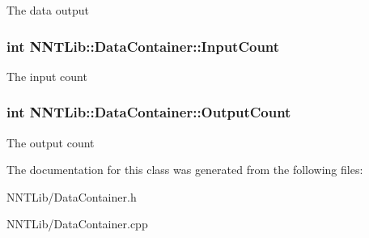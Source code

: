 The data output 

\hypertarget{class_n_n_t_lib_1_1_data_container_a4929c69fbf3ac00f7bbd277414aac54e}{}
\subsubsection[{Input\+Count}]{\setlength{\rightskip}{0pt plus 5cm}int N\+N\+T\+Lib\+::\+Data\+Container\+::\+Input\+Count}\label{class_n_n_t_lib_1_1_data_container_a4929c69fbf3ac00f7bbd277414aac54e}


The input count 

\hypertarget{class_n_n_t_lib_1_1_data_container_a821ff2aaddaf2bd392f0741b5f33799c}{}
\subsubsection[{Output\+Count}]{\setlength{\rightskip}{0pt plus 5cm}int N\+N\+T\+Lib\+::\+Data\+Container\+::\+Output\+Count}\label{class_n_n_t_lib_1_1_data_container_a821ff2aaddaf2bd392f0741b5f33799c}


The output count 



The documentation for this class was generated from the following files\+:\begin{DoxyCompactItemize}
\item 
N\+N\+T\+Lib/Data\+Container.\+h\item 
N\+N\+T\+Lib/Data\+Container.\+cpp\end{DoxyCompactItemize}
